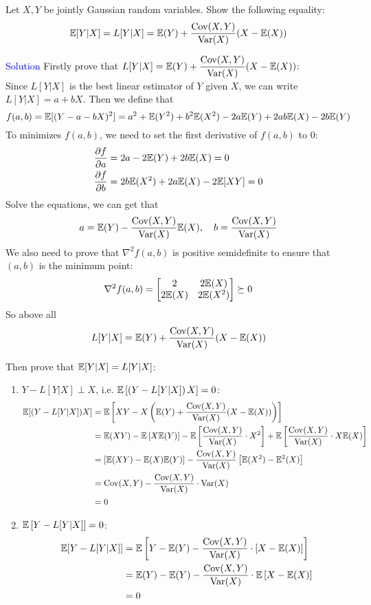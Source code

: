 \begin{homeworkProblem}

Let $X, Y$ be jointly Gaussian random variables. Show the following equality:
$$\mathbb{E}[Y | X]=L[Y | X]=\mathbb{E}(Y)+\dfrac{\mathrm{Cov}(X, Y)}{\mathrm{Var}(X)}(X-\mathbb{E}(X))$$

\textcolor{blue}{Solution}
Firstly prove that $L[Y|X]=\mathbb{E}(Y)+\dfrac{\mathrm{Cov}(X, Y)}{\mathrm{Var}(X)}(X-\mathbb{E}(X))$: \\
Since $L[Y|X]$ is the best linear estimator of $Y$ given $X$, we can write $L[Y|X]=a+bX$. Then we define that
$$f(a,b) = \mathbb{E}[(Y - a - bX)^2] = a^2 + \mathbb{E}(Y^2) + b^2 \mathbb{E}(X^2) - 2a \mathbb{E}(Y) + 2ab \mathbb{E}(X) - 2b \mathbb{E}(Y)$$
To minimizes $f(a,b)$, we need to set the first derivative of $f(a,b)$ to $0$:
\begin{align*}
\dfrac{\partial f}{\partial a} &= 2a - 2\mathbb{E}(Y) + 2b \mathbb{E}(X) = 0 \\
\dfrac{\partial f}{\partial b} &= 2b \mathbb{E}(X^2) + 2a \mathbb{E}(X) - 2\mathbb{E}[XY] = 0
\end{align*}
Solve the equations, we can get that
$$a = \mathbb{E}(Y) - \dfrac{\mathrm{Cov}(X,Y)}{\mathrm{Var}(X)} \mathbb{E}(X),\quad b = \dfrac{\mathrm{Cov}(X,Y)}{\mathrm{Var}(X)}$$
We also need to prove that $\nabla^2 f(a,b)$ is positive semidefinite to ensure that $(a, b)$ is the minimum point:
$$\nabla^2 f(a,b) = \begin{bmatrix} 2 & 2 \mathbb{E}(X) \\ 2 \mathbb{E}(X) & 2 \mathbb{E}(X^2) \end{bmatrix}\succeq 0$$
So above all
$$L[Y|X] = \mathbb{E}(Y) + \dfrac{\mathrm{Cov}(X,Y)}{\mathrm{Var}(X)} (X - \mathbb{E}(X))$$


Then prove that $\mathbb{E}[Y|X]=L[Y|X]$:
\begin{enumerate}
\item $Y-L[Y|X] \perp X$, i.e. $\mathbb{E}\left[\left(Y-L[Y|X]\right)X\right]=0$:
\begin{align*}
\mathbb{E}[(Y - L[Y|X])X] &= \mathbb{E}\left[XY - X\left(\mathbb{E}(Y)+\dfrac{\mathrm{Cov}(X, Y)}{\mathrm{Var}(X)}(X-\mathbb{E}(X))\right)\right] \\
&= \mathbb{E}(XY) - \mathbb{E}\left[X\mathbb{E}(Y)\right] - \mathbb{E}\left[\dfrac{\mathrm{Cov}(X,Y)}{\mathrm{Var}(X)}\cdot X^2\right] + \mathbb{E}\left[\dfrac{\mathrm{Cov}(X,Y)}{\mathrm{Var}(X)}\cdot X \mathbb{E}(X)\right] \\
&= \left[\mathbb{E}(XY) - \mathbb{E}(X)\mathbb{E}(Y)\right] - \dfrac{\mathrm{Cov}(X,Y)}{\mathrm{Var}(X)}\left[\mathbb{E}(X^2) - \mathbb{E}^2(X)\right] \\
&= \mathrm{Cov}(X,Y) - \dfrac{\mathrm{Cov}(X,Y)}{\mathrm{Var}(X)} \cdot \mathrm{Var}(X) \\
&= 0
\end{align*}
\item $\mathbb{E}\left[Y-L[Y|X]\right] = 0$:
\begin{align*}
\mathbb{E}[Y - L[Y|X]] &= \mathbb{E}\left[Y - \mathbb{E}(Y) - \dfrac{\mathrm{Cov}(X,Y)}{\mathrm{Var}(X)}\cdot\left[X - \mathbb{E}(X)\right]\right] \\
&= \mathbb{E}(Y) - \mathbb{E}(Y) - \dfrac{\mathrm{Cov}(X,Y)}{\mathrm{Var}(X)}\cdot\mathbb{E}\left[X - \mathbb{E}(X)\right] \\
&= 0
\end{align*}


\end{enumerate}
\end{homeworkProblem}
